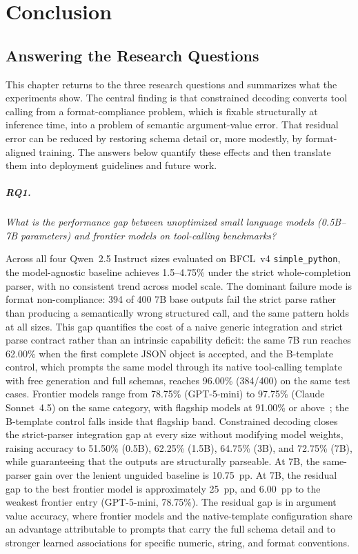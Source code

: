 \chapter{Conclusion} \label{ch:conclusion}

\section{Answering the Research Questions}

This chapter returns to the three research questions and summarizes what the
experiments show. The central finding is that constrained decoding converts
tool calling from a format-compliance problem, which is fixable structurally at
inference time, into a problem of semantic argument-value error. That residual
error can be reduced by restoring schema detail or, more modestly, by
format-aligned training. The answers below quantify these effects and then
translate them into deployment guidelines and future work.

\paragraph{RQ1.} \textit{What is the performance gap between unoptimized small
language models (0.5B--7B parameters) and frontier models on tool-calling benchmarks?}

Across all four Qwen~2.5 Instruct sizes evaluated on
BFCL~v4 \texttt{simple\_python}, the model-agnostic baseline achieves
1.5--4.75\% under the strict whole-completion parser, with no consistent
trend across model scale. The dominant failure mode is format non-compliance:
394 of 400 7B base outputs fail the strict parse rather than producing a
semantically wrong structured call, and the same pattern holds at all sizes.
This gap quantifies the cost of a naive generic integration and strict parse
contract rather than an intrinsic capability deficit: the same 7B run reaches
62.00\% when the first complete JSON object is accepted, and the B-template
control, which prompts the same model through its native tool-calling template
with free generation and full schemas, reaches 96.00\% (384/400) on the same
test cases.
Frontier models range from 78.75\% (GPT-5-mini) to 97.75\%
(Claude Sonnet~4.5) on the same category, with flagship models at
91.00\% or above~\cite{bfcl2024}; the B-template control falls inside
that flagship band.
Constrained decoding closes the strict-parser integration gap at every size
without modifying model weights, raising accuracy to 51.50\% (0.5B),
62.25\% (1.5B), 64.75\% (3B), and 72.75\% (7B), while guaranteeing that the
outputs are structurally parseable. At 7B, the same-parser gain over the
lenient unguided baseline is 10.75~pp.
At 7B, the residual gap to the best frontier model is approximately
25~pp, and 6.00~pp to the weakest frontier entry (GPT-5-mini,
78.75\%).
The residual gap is in argument value accuracy, where frontier models
and the native-template configuration share an advantage attributable
to prompts that carry the full schema detail and to stronger learned
associations for specific numeric, string, and format conventions.

